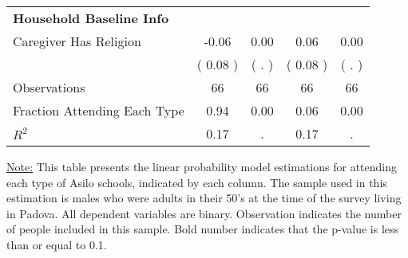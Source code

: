 \begin{table}[H]
{\begin{tabular}{lcccc}
\midrule
\textbf{Household Baseline Info} \\
\quad Caregiver Has Religion &     -0.06 &      0.00 &      0.06 &      0.00 \\
\quad  & (     0.08 ) & (        . )  & (     0.08 )  & (        . )  \\
\midrule
Observations & 66 & 66 & 66 & 66 \\
Fraction Attending Each Type &      0.94 &      0.00 &      0.06 &      0.00 \\
\midrule
$ R^2$ &      0.17 &         . &      0.17 &         . \\
\bottomrule
\end{tabular}}
\end{table}
\begin{footnotesize}
\noindent\underline{Note:} This table presents the linear probability model estimations for attending each type of Asilo schools, indicated by each column. The sample used in this estimation is males who were adults in their 50's at the time of the survey living in Padova. All dependent variables are binary. Observation indicates the number of people included in this sample. Bold number indicates that the p-value is less than or equal to 0.1.
\end{footnotesize}
